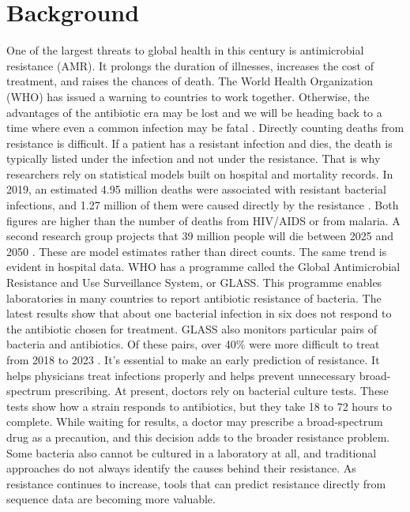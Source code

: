 \section{Background}
One of the largest threats to global health in this century is antimicrobial resistance (AMR). It prolongs the duration of illnesses, increases the cost of treatment, and raises the chances of death. The World Health Organization (WHO) has issued a warning to countries to work together. Otherwise, the advantages of the antibiotic era may be lost and we will be heading back to a time where even a common infection may be fatal \cite{who_amr_2019}. Directly counting deaths from resistance is difficult. If a patient has a resistant infection and dies, the death is typically listed under the infection and not under the resistance. That is why researchers rely on statistical models built on hospital and mortality records. In 2019, an estimated 4.95 million deaths were associated with resistant bacterial infections, and 1.27 million of them were caused directly by the resistance \cite{murray2022gram}. Both figures are higher than the number of deaths from HIV/AIDS or from malaria. A second research group projects that 39 million people will die between 2025 and 2050 \cite{naghavi2024forecast}. These are model estimates rather than direct counts. The same trend is evident in hospital data. WHO has a programme called the Global Antimicrobial Resistance and Use Surveillance System, or GLASS. This programme enables laboratories in many countries to report antibiotic resistance of bacteria. The latest results show that about one bacterial infection in six does not respond to the antibiotic chosen for treatment. GLASS also monitors particular pairs of bacteria and antibiotics. Of these pairs, over 40\% were more difficult to treat from 2018 to 2023 \cite{who2025glass}. It's essential to make an early prediction of resistance. It helps physicians treat infections properly and helps prevent unnecessary broad-spectrum prescribing. At present, doctors rely on bacterial culture tests. These tests show how a strain responds to antibiotics, but they take 18 to 72 hours to complete. While waiting for results, a doctor may prescribe a broad-spectrum drug as a precaution, and this decision adds to the broader resistance problem. Some bacteria also cannot be cultured in a laboratory at all, and traditional approaches do not always identify the causes behind their resistance. As resistance continues to increase, tools that can predict resistance directly from sequence data are becoming more valuable.

